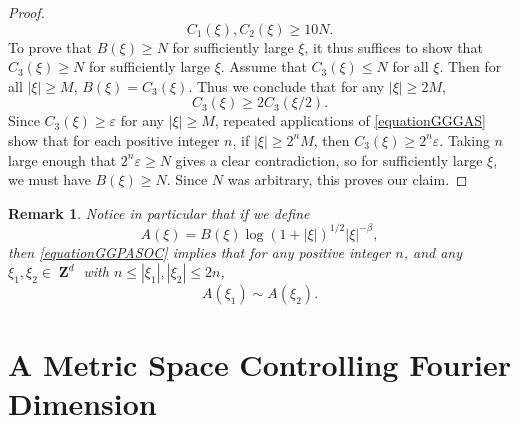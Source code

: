 \documentclass[12pt,reqno]{article}
\numberwithin{equation}{section}
\DeclareMathOperator{\ZZ}{\mathbf{Z}}
\newtheorem*{remark}{Remark}
\begin{document}
\begin{proof}
    \[ C_1(\xi), C_2(\xi) \geq 10N. \]
    To prove that $B(\xi) \geq N$ for sufficiently large $\xi$, it thus suffices to show that $C_3(\xi) \geq N$ for sufficiently large $\xi$. Assume that $C_3(\xi) \leq N$ for all $\xi$. Then for all $|\xi| \geq M$, $B(\xi) = C_3(\xi)$. Thus we conclude that for any $|\xi| \geq 2M$,
    \begin{equation} \label{equationGGGAS}
        C_3(\xi) \geq 2 C_3(\xi/2).
    \end{equation}
    Since $C_3(\xi) \geq \varepsilon$ for any $|\xi| \geq M$, repeated applications of \eqref{equationGGGAS} show that for each positive integer $n$, if $|\xi| \geq 2^n M$, then $C_3(\xi) \geq 2^n \varepsilon$. Taking $n$ large enough that $2^n \varepsilon \geq N$ gives a clear contradiction, so for sufficiently large $\xi$, we must have $B(\xi) \geq N$. Since $N$ was arbitrary, this proves our claim.
\end{proof}

\begin{remark}
    Notice in particular that if we define
    \[ A(\xi) = B(\xi) \log(1 + |\xi|)^{1/2} |\xi|^{-\beta}, \]
    then \eqref{equationGGPASOC} implies that for any positive integer $n$, and any $\xi_1, \xi_2 \in \ZZ^d$ with $n \leq |\xi_1|, |\xi_2| \leq 2n$,
    \begin{equation} \label{equationASADSDSCGGGGG}
        A(\xi_1) \sim A(\xi_2).
    \end{equation}
\end{remark}

\section{A Metric Space Controlling Fourier Dimension}
\end{document}
